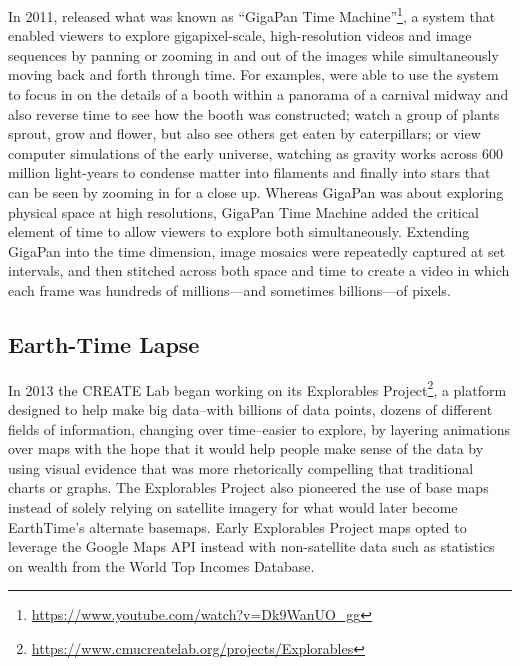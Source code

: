 \documentclass[
]{krantz}
\renewcommand{\href}[2]{#2\footnote{\url{#1}}}
\begin{document}
In 2011, released what was known as \href{https://www.youtube.com/watch?v=Dk9WanUO_gg}{``GigaPan Time Machine''}, a system that enabled viewers to explore gigapixel-scale, high-resolution videos and image sequences by panning or zooming in and out of the images while simultaneously moving back and forth through time. For examples, were able to use the system to focus in on the details of a booth within a panorama of a carnival midway and also reverse time to see how the booth was constructed; watch a group of plants sprout, grow and flower, but also see others get eaten by caterpillars; or view computer simulations of the early universe, watching as gravity works across 600 million light-years to condense matter into filaments and finally into stars that can be seen by zooming in for a close up. Whereas GigaPan was about exploring physical space at high resolutions, GigaPan Time Machine added the critical element of time to allow viewers to explore both simultaneously. Extending GigaPan into the time dimension, image mosaics were repeatedly captured at set intervals, and then stitched across both space and time to create a video in which each frame was hundreds of millions---and sometimes billions---of pixels.

\hypertarget{earth-time-lapse}{%
\subsection*{Earth-Time Lapse}\label{earth-time-lapse}}


In 2013 the CREATE Lab began working on its \href{https://www.cmucreatelab.org/projects/Explorables}{Explorables Project}, a platform designed to help make big data--with billions of data points, dozens of different fields of information, changing over time--easier to explore, by layering animations over maps with the hope that it would help people make sense of the data by using visual evidence that was more rhetorically compelling that traditional charts or graphs. The Explorables Project also pioneered the use of base maps instead of solely relying on satellite imagery for what would later become EarthTime's alternate basemaps. Early Explorables Project maps opted to leverage the Google Maps API instead with non-satellite data such as statistics on wealth from the World Top Incomes Database.
\end{document}
